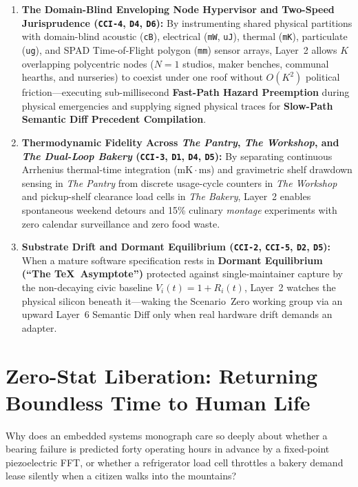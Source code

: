 \begin{enumerate}
    \item \textbf{The Domain-Blind Enveloping Node Hypervisor and Two-Speed Jurisprudence (\texttt{CCI-4}, \texttt{D4}, \texttt{D6}):} By instrumenting shared physical partitions with domain-blind acoustic (\texttt{cB}), electrical (\texttt{mW}, \texttt{uJ}), thermal (\texttt{mK}), particulate (\texttt{ug}), and SPAD Time-of-Flight polygon (\texttt{mm}) sensor arrays, Layer~2 allows $K$ overlapping polycentric nodes ($N=1$ studios, maker benches, communal hearths, and nurseries) to coexist under one roof without $O(K^2)$ political friction---executing sub-millisecond \textbf{Fast-Path Hazard Preemption} during physical emergencies and supplying signed physical traces for \textbf{Slow-Path Semantic Diff Precedent Compilation}.
    \item \textbf{Thermodynamic Fidelity Across \textit{The Pantry}, \textit{The Workshop}, and \textit{The Dual-Loop Bakery} (\texttt{CCI-3}, \texttt{D1}, \texttt{D4}, \texttt{D5}):} By separating continuous Arrhenius thermal-time integration ($\mathrm{mK\cdot ms}$) and gravimetric shelf drawdown sensing in \textit{The Pantry} from discrete usage-cycle counters in \textit{The Workshop} and pickup-shelf clearance load cells in \textit{The Bakery}, Layer~2 enables spontaneous weekend detours and 15\% culinary \textit{montage} experiments with zero calendar surveillance and zero food waste.
    \item \textbf{Substrate Drift and Dormant Equilibrium (\texttt{CCI-2}, \texttt{CCI-5}, \texttt{D2}, \texttt{D5}):} When a mature software specification rests in \textbf{Dormant Equilibrium (``The \TeX\ Asymptote'')} protected against single-maintainer capture by the non-decaying civic baseline $V_i(t) = 1 + R_i(t)$, Layer~2 watches the physical silicon beneath it---waking the Scenario~Zero working group via an upward Layer~6 Semantic Diff only when real hardware drift demands an adapter.
\end{enumerate}

\section{Zero-Stat Liberation: Returning Boundless Time to Human Life}
\label{sec:l2-conclusion-boundless-time}

Why does an embedded systems monograph care so deeply about whether a bearing failure is predicted forty operating hours in advance by a fixed-point piezoelectric FFT, or whether a refrigerator load cell throttles a bakery demand lease silently when a citizen walks into the mountains?


